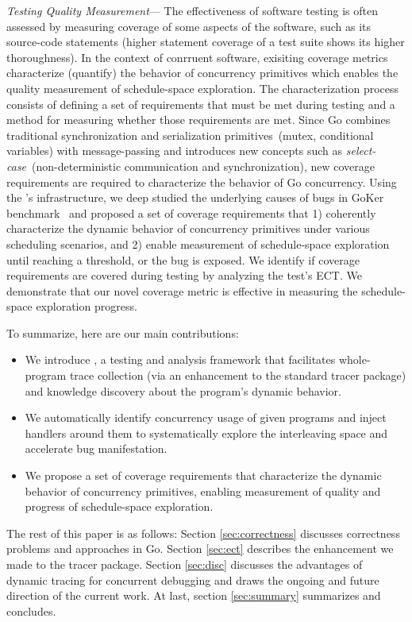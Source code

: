  \textit{Testing Quality Measurement}---
The effectiveness of software testing is often assessed by measuring coverage of some aspects of the software, such as its source-code statements (\eg higher statement coverage of a test suite shows its higher thoroughness).
%
In the context of conrruent software, exisiting coverage metrics~\cite{edelstein2003contest,trainin-followsCoverage-padtad09,hong-syncTesting-issta12,yu-pset-isca09} characterize (quantify) the behavior of concurrency primitives which enables the quality measurement of schedule-space exploration.
%
The characterization process consists of defining a set of requirements that must be met during testing and a method for measuring whether those requirements are met.
%
Since Go combines traditional synchronization and serialization primitives~(mutex, conditional variables) with message-passing and introduces new concepts such as \textit{select-case}~(non-deterministic communication and synchronization), new coverage requirements are required to characterize the behavior of Go concurrency.
%
Using the \goat's infrastructure, we deep studied the underlying causes of bugs in GoKer benchmark~\cite{yuan-gobench-cgo21} and proposed a set of coverage requirements that 1) coherently characterize the dynamic behavior of concurrency primitives under various scheduling scenarios, and 2) enable measurement of schedule-space exploration until reaching a threshold, or the bug is exposed.
%
We identify if coverage requirements are covered during testing by analyzing the test's ECT.
%
We demonstrate that our novel coverage metric is effective in measuring the schedule-space exploration progress.


To summarize, here are our main contributions:
\begin{itemize}
    \item We introduce \goat, a testing and analysis framework that facilitates whole-program trace collection (via an enhancement to the standard tracer package) and knowledge discovery about the program's dynamic behavior.
    \item We automatically identify concurrency usage of given programs and inject handlers around them to systematically explore the interleaving space and accelerate bug manifestation.
    \item We propose a set of coverage requirements that characterize the dynamic behavior of concurrency primitives, enabling measurement of quality and progress of schedule-space exploration.
\end{itemize}

The rest of this paper is as follows: Section \ref{sec:correctness} discusses correctness problems and approaches in Go. Section \ref{sec:ect} describes the enhancement we made to the tracer package. Section \ref{sec:disc} discusses the advantages of dynamic tracing for concurrent debugging and draws the ongoing and future direction of the current work. At last, section \ref{sec:summary} summarizes and concludes.
